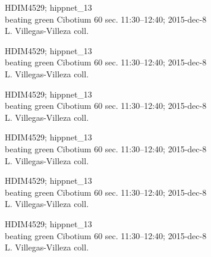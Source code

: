 \documentclass[2pt]{extarticle}
\begin{document}
\noindent
\parbox{0.16\textwidth}{\tiny \raggedright \rule[-0.3\baselineskip]{0pt}{10pt}HDIM4529; hippnet\_13\\ beating green Cibotium 60 sec. 11:30--12:40; 2015-dec-8\\ L. Villegas-Villeza coll.}
\parbox{0.16\textwidth}{\tiny \raggedright \rule[-0.3\baselineskip]{0pt}{10pt}HDIM4529; hippnet\_13\\ beating green Cibotium 60 sec. 11:30--12:40; 2015-dec-8\\ L. Villegas-Villeza coll.}
\parbox{0.16\textwidth}{\tiny \raggedright \rule[-0.3\baselineskip]{0pt}{10pt}HDIM4529; hippnet\_13\\ beating green Cibotium 60 sec. 11:30--12:40; 2015-dec-8\\ L. Villegas-Villeza coll.}
\parbox{0.16\textwidth}{\tiny \raggedright \rule[-0.3\baselineskip]{0pt}{10pt}HDIM4529; hippnet\_13\\ beating green Cibotium 60 sec. 11:30--12:40; 2015-dec-8\\ L. Villegas-Villeza coll.}
\parbox{0.16\textwidth}{\tiny \raggedright \rule[-0.3\baselineskip]{0pt}{10pt}HDIM4529; hippnet\_13\\ beating green Cibotium 60 sec. 11:30--12:40; 2015-dec-8\\ L. Villegas-Villeza coll.}
\parbox{0.16\textwidth}{\tiny \raggedright \rule[-0.3\baselineskip]{0pt}{10pt}HDIM4529; hippnet\_13\\ beating green Cibotium 60 sec. 11:30--12:40; 2015-dec-8\\ L. Villegas-Villeza coll.} \\ 
\vspace{0.001in} 
\end{document}
